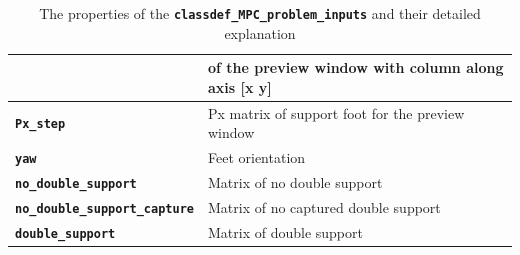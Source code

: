 \documentclass[12pt,oneside,notitlepage,abstracton,a4paper]{scrartcl}
\begin{document}
\begin{table}[!htbp]
\begin{center}
\begin{tabular}{|l|l|}
                                 &  of the preview window with column along axis [x y]  \\ \hline   
 \textbf{\texttt{Px\_step}}         & Px matrix of support foot for the preview window \\  \hline 
 \textbf{\texttt{yaw}}         & Feet orientation \\    \hline 
 \textbf{\texttt{no\_double\_support}}         & Matrix of no double support  \\ \hline 
 \textbf{\texttt{no\_double\_support\_capture}}         & Matrix of no captured double support  \\ \hline  
 \textbf{\texttt{double\_support}}         & Matrix of double support  \\ \hline  
\end{tabular}
\caption {The properties of the \textbf{\texttt{classdef\_MPC\_problem\_inputs}} and their detailed explanation}
\label{tbl:paras7}
\end{center}
\end{table}


  

 
\end{document}
